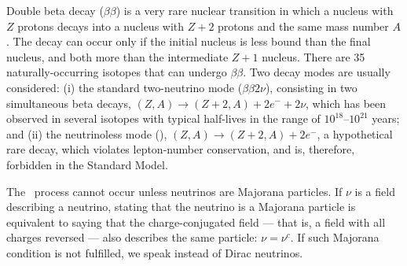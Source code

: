 Double beta decay ($\beta\beta$) is a very rare nuclear transition in which a nucleus with $Z$ protons decays into a nucleus with $Z + 2$ protons and the same mass number $A$. The decay can occur only if the initial nucleus is less bound than the final nucleus, and both more than the intermediate $Z + 1$ nucleus. There are 35 naturally-occurring isotopes that can undergo $\beta\beta$. Two decay modes are usually considered: (i) the standard two-neutrino mode ($\beta\beta2\nu$), consisting in two simultaneous beta decays, $(Z,A) \rightarrow (Z + 2,A) + 2 e^- +2 \nu$, which has been observed in several isotopes with typical half-lives in the range of $10^{18}$--$10^{21}$ years; and (ii) the neutrinoless mode (\bbonu), $(Z,A) \rightarrow (Z +2, A) + 2 e^-$, a hypothetical rare decay, which violates lepton-number conservation, and is, therefore, forbidden in the Standard Model.

The \bbonu\ process cannot occur unless neutrinos are Majorana particles. 
%
%
%
%
If $\nu$ is a field describing a neutrino, stating that the neutrino is a Majorana particle is equivalent to saying that the charge-conjugated field --- that is, a field with all charges reversed --- also describes the same particle: $\nu=\nu^c$. If such Majorana condition is not fulfilled, we speak instead of Dirac neutrinos. 

